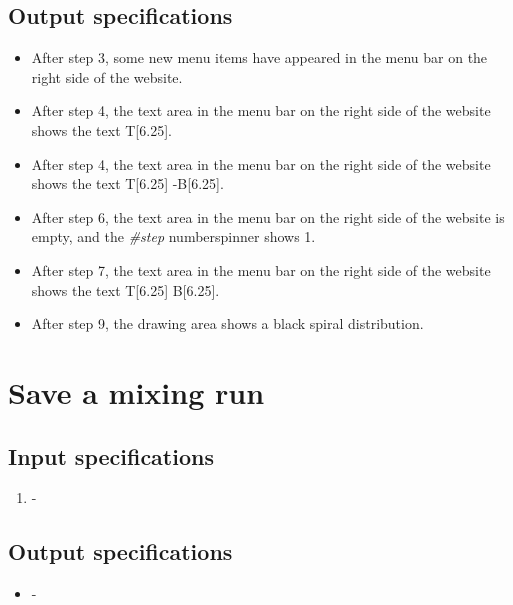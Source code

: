 \subsection*{Output specifications}
\begin{itemize}
\item After step 3, some new menu items have appeared in the menu bar on the right side of the website.
\item After step 4, the text area in the menu bar on the right side of the website shows the text T[6.25].
\item After step 4, the text area in the menu bar on the right side of the website shows the text T[6.25] -B[6.25].
\item After step 6, the text area in the menu bar on the right side of the website is empty, and the \emph{\#step} numberspinner shows 1.
\item After step 7, the text area in the menu bar on the right side of the website shows the text T[6.25] B[6.25].
\item After step 9, the drawing area shows a black spiral distribution.
\end{itemize}

\section{Save a mixing run}

\subsection*{Input specifications}
\begin{enumerate}
\item -
\end{enumerate}

\subsection*{Output specifications}
\begin{itemize}
\item -
\end{itemize}

